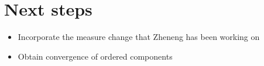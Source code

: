 

\section{Next steps}
\begin{itemize}
        \item Incorporate the measure change that Zheneng has been working on
        \item Obtain convergence of ordered components
\end{itemize}